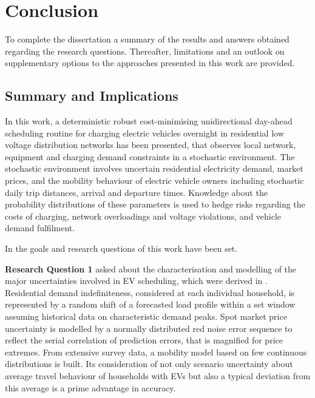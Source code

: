 \chapter{Conclusion}
\label{sec:concl}

To complete the dissertation a summary of the results and answers obtained regarding the research questions. Thereafter, limitations and an outlook on supplementary options to the approaches presented in this work are provided.

\section{Summary and Implications}

In this work, a deterministic robust cost-minimising unidirectional day-ahead scheduling routine for charging electric vehicles overnight in residential low voltage distribution networks has been presented, that observes local network, equipment and charging demand constraints in a stochastic environment. The stochastic environment involves uncertain residential electricity demand, market prices, and the mobility behaviour of electric vehicle owners including stochastic daily trip distances, arrival and departure times. Knowledge about the probability distributions of these parameters is used to hedge risks regarding the costs of charging, network overloadings and voltage violations, and vehicle demand fulfilment.

In  the goals and research questions of this work have been set.

\textbf{Research Question 1} asked about the characterisation and modelling of the major uncertainties involved in EV scheduling, which were derived in . Residential demand indefiniteness, considered at each individual household, is represented by a random shift of a forecasted load profile within a set window assuming historical data on characteristic demand peaks. Spot market price uncertainty is modelled by a normally distributed red noise error sequence to reflect the serial correlation of prediction errors, that is magnified for price extremes. From extensive survey data, a mobility model based on few continuous distributions is built. Its consideration of not only scenario uncertainty about average travel behaviour of households with EVs but also a typical deviation from this average is a prime advantage in accuracy.

